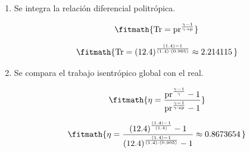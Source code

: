 \begin{enumerate}

\item Se integra la relación diferencial politrópica.

\[\fitmath{\mathrm{Tr}={\mathrm{pr}}^{\frac{\gamma-1}{\gamma\cdot \mathrm{ep}}}}\]

\[\fitmath{\mathrm{Tr}={(12.4)}^{\frac{(1.4)-1}{(1.4)\cdot (0.905)}}\approx 2.214115\,}\]

\item Se compara el trabajo isentrópico global con el real.

\[\fitmath{\eta=\frac{{\mathrm{pr}}^{\frac{\gamma-1}{\gamma}}-1}{{\mathrm{pr}}^{\frac{\gamma-1}{\gamma\cdot \mathrm{ep}}}-1}}\]

\[\fitmath{\eta=\frac{{(12.4)}^{\frac{(1.4)-1}{(1.4)}}-1}{{(12.4)}^{\frac{(1.4)-1}{(1.4)\cdot (0.905)}}-1}\approx 0.8673654\,}\]

\end{enumerate}
